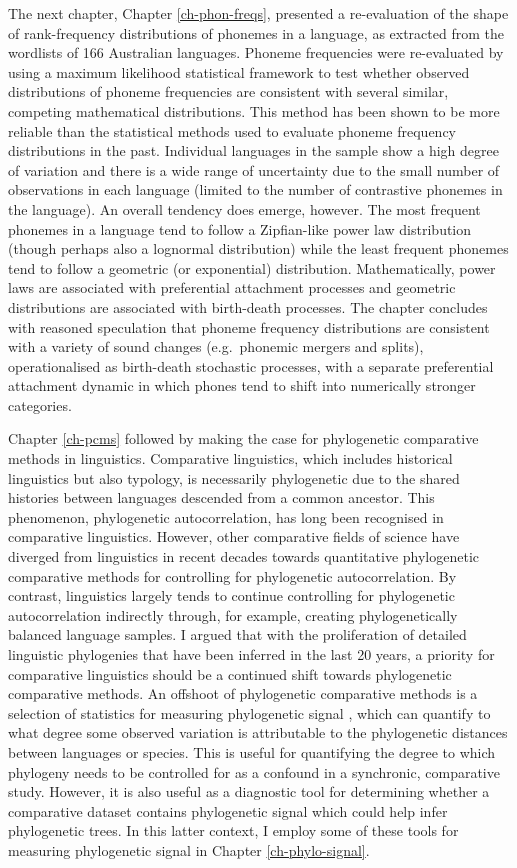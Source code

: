 The next chapter, Chapter \ref{ch-phon-freqs}, presented a re-evaluation of the shape of rank-frequency distributions of phonemes in a language, as extracted from the wordlists of 166 Australian languages. Phoneme frequencies were re-evaluated by using a maximum likelihood statistical framework \autocite{clauset_power-law_2009} to test whether observed distributions of phoneme frequencies are consistent with several similar, competing mathematical distributions. This method has been shown to be more reliable than the statistical methods used to evaluate phoneme frequency distributions in the past. Individual languages in the sample show a high degree of variation and there is a wide range of uncertainty due to the small number of observations in each language (limited to the number of contrastive phonemes in the language). An overall tendency does emerge, however. The most frequent phonemes in a language tend to follow a Zipfian-like power law distribution (though perhaps also a lognormal distribution) while the least frequent phonemes tend to follow a geometric (or exponential) distribution. Mathematically, power laws are associated with preferential attachment processes and geometric distributions are associated with birth-death processes. The chapter concludes with reasoned speculation that phoneme frequency distributions are consistent with a variety of sound changes (e.g.~phonemic mergers and splits), operationalised as birth-death stochastic processes, with a separate preferential attachment dynamic in which phones tend to shift into numerically stronger categories.

Chapter \ref{ch-pcms} followed by making the case for phylogenetic comparative methods in linguistics. Comparative linguistics, which includes historical linguistics but also typology, is necessarily phylogenetic due to the shared histories between languages descended from a common ancestor. This phenomenon, phylogenetic autocorrelation, has long been recognised in comparative linguistics. However, other comparative fields of science have diverged from linguistics in recent decades towards quantitative phylogenetic comparative methods for controlling for phylogenetic autocorrelation. By contrast, linguistics largely tends to continue controlling for phylogenetic autocorrelation indirectly through, for example, creating phylogenetically balanced language samples. I argued that with the proliferation of detailed linguistic phylogenies that have been inferred in the last 20 years, a priority for comparative linguistics should be a continued shift towards phylogenetic comparative methods. An offshoot of phylogenetic comparative methods is a selection of statistics for measuring phylogenetic signal \autocite[e.g.][]{blomberg_testing_2003}, which can quantify to what degree some observed variation is attributable to the phylogenetic distances between languages or species. This is useful for quantifying the degree to which phylogeny needs to be controlled for as a confound in a synchronic, comparative study. However, it is also useful as a diagnostic tool for determining whether a comparative dataset contains phylogenetic signal which could help infer phylogenetic trees. In this latter context, I employ some of these tools for measuring phylogenetic signal in Chapter \ref{ch-phylo-signal}.

